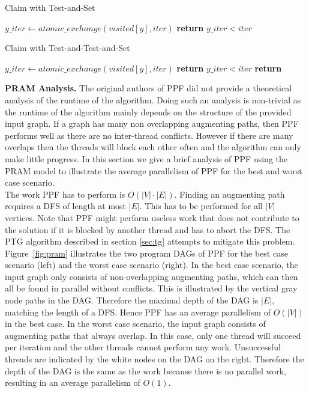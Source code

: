 \documentclass[letterpaper]{article}
\newcommand{\mypar}[1]{{\bf #1.}}
\begin{document}
\begin{algorithm}
    \caption{Claim with Test-and-Set}
    \label{alg:claim_tas}
    \begin{algorithmic}[1]
            \State $y\_iter \gets atomic\_exchange(visited[y], iter)$
            \State \textbf{return} $y\_iter < iter$
        \EndProcedure
    \end{algorithmic}
\end{algorithm}


\begin{algorithm}
    \caption{Claim with Test-and-Test-and-Set}
    \label{alg:claim_ttas}
    \begin{algorithmic}[1]
                \State $y\_iter \gets atomic\_exchange(visited[y], iter)$
                \State \textbf{return} $y\_iter < iter$
            \EndIf
            \State \textbf{return} \False
        \EndProcedure
    \end{algorithmic}
\end{algorithm}

\mypar{PRAM Analysis} The original authors of PPF did not provide a theoretical analysis of the runtime of the algorithm.
Doing such an analysis is non-trivial as the runtime of the algorithm mainly depends on the structure of the provided
input graph. If a graph has many non overlapping augmenting paths, then PPF performs well as there are no inter-thread conflicts. 
However if there are many overlaps then the threads will block each other often and the algorithm can only make little progress.
In this section we give a brief analysis of PPF using the PRAM model to illustrate the average parallelism of PPF for the best and worst case
scenario. \\

The work PPF has to perform is $O(|V|\cdot|E|)$. Finding an augmenting path requires a DFS of length at most $|E|$. 
This has to be performed for all $|V|$ vertices. Note that PPF might perform useless work that does not contribute to the solution
if it is blocked by another thread and has to abort the DFS. 
The PTG algorithm described in section \ref{sec:tg} attempts to mitigate this problem.\\

Figure~\ref{fig:pram} illustrates the two program DAGs of PPF for the best case scenario (left) and the worst case scenario (right).
In the best case scenario, the input graph only consists of non-overlapping augmenting paths, which can then all be found in parallel without conflicts. 
This is illustrated by the vertical gray node paths in the DAG.
Therefore the maximal depth of the DAG is $|E|$, matching the length of a DFS. Hence PPF has an average parallelism of $O(|V|)$ in the best case.
In the worst case scenario, the input graph consists of augmenting paths that always overlap. 
In this case, only one thread will succeed per iteration and the other threads cannot perform any work. 
Unsuccessful threads are indicated by the white nodes on the DAG on the right. 
Therefore the depth of the DAG is the same as the work because there is no parallel work, resulting in an average parallelism of $O(1)$.\\
\end{document}
